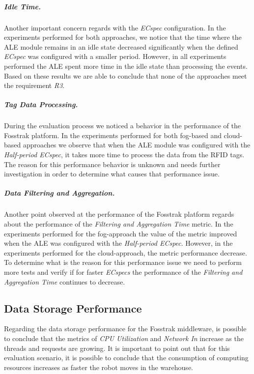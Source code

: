        \subparagraph{Idle Time.}
        \label{subp:eval_idle_time}
        Another important concern regards with the \textit{ECspec} configuration. In the experiments
        performed for both approaches, we notice that the time where the \gls{ALE} module remains in an idle
        state decreased significantly when the defined \textit{ECspec} was configured with a smaller period.
        However, in all experiments performed the \gls{ALE} spent more time in the idle state than
        processing the events. Based on these results we are able to conclude that none of the approaches
        meet the requirement \textit{R3}.

        \subparagraph{Tag Data Processing.}
        \label{subp:eval_tag_processing}
        During the evaluation process we noticed a behavior in the performance of the Fosstrak platform.
        In the experiments performed for both fog-based and cloud-based approaches we observe that when
        the \gls{ALE} module was configured with the \textit{Half-period ECspec}, it takes more time to
        process the data from the \gls{RFID} tags. The reason for this performance behavior is unknown and
        needs further investigation in order to determine what causes that performance issue.

        \subparagraph{Data Filtering and Aggregation.}
        \label{subp:data_filtering_aggregation}
        Another point observed at the performance of the Fosstrak platform regards about the performance
        of the \textit{Filtering and Aggregation Time} metric. In the experiments performed for the
        fog-approach the value of the metric improved when the \gls{ALE} was configured with the
        \textit{Half-period ECspec}. However, in the experiments performed for the cloud-approach, the
        metric performance decrease. To determine what is the reason for this performance issue we need
        to perform more tests and verify if for faster \textit{ECspecs} the performance of the
        \textit{Filtering and Aggregation Time} continues to decrease.

        \subsection{Data Storage Performance}
        \label{subs:eval_results_data}
        Regarding the data storage performance for the Fosstrak middleware, is possible to conclude that the metrics
        of \textit{CPU Utilization} and \textit{Network In} increase as the threads and requests are growing.
        It is important to point out that for this evaluation scenario, it is possible to conclude that the
        consumption of computing resources increases as faster the robot moves in the warehouse.\\

